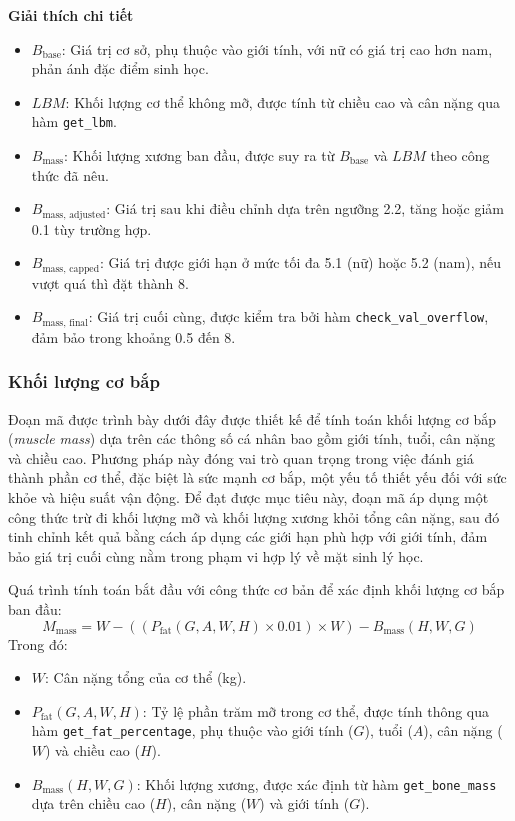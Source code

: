 \textbf{Giải thích chi tiết}
\begin{itemize}
    \item \( B_{\text{base}} \): Giá trị cơ sở, phụ thuộc vào giới tính, với nữ có giá trị cao hơn nam, phản ánh đặc điểm sinh học.
    \item \( LBM \): Khối lượng cơ thể không mỡ, được tính từ chiều cao và cân nặng qua hàm \texttt{get\_lbm}.
    \item \( B_{\text{mass}} \): Khối lượng xương ban đầu, được suy ra từ \( B_{\text{base}} \) và \( LBM \) theo công thức đã nêu.
    \item \( B_{\text{mass, adjusted}} \): Giá trị sau khi điều chỉnh dựa trên ngưỡng 2.2, tăng hoặc giảm 0.1 tùy trường hợp.
    \item \( B_{\text{mass, capped}} \): Giá trị được giới hạn ở mức tối đa 5.1 (nữ) hoặc 5.2 (nam), nếu vượt quá thì đặt thành 8.
    \item \( B_{\text{mass, final}} \): Giá trị cuối cùng, được kiểm tra bởi hàm \texttt{check\_val\_overflow}, đảm bảo trong khoảng 0.5 đến 8.
\end{itemize}

\subsubsection{Khối lượng cơ bắp}
Đoạn mã được trình bày dưới đây được thiết kế để tính toán khối lượng cơ bắp (\textit{muscle mass}) dựa trên các thông số cá nhân bao gồm giới tính, tuổi, cân nặng và chiều cao. Phương pháp này đóng vai trò quan trọng trong việc đánh giá thành phần cơ thể, đặc biệt là sức mạnh cơ bắp, một yếu tố thiết yếu đối với sức khỏe và hiệu suất vận động. Để đạt được mục tiêu này, đoạn mã áp dụng một công thức trừ đi khối lượng mỡ và khối lượng xương khỏi tổng cân nặng, sau đó tinh chỉnh kết quả bằng cách áp dụng các giới hạn phù hợp với giới tính, đảm bảo giá trị cuối cùng nằm trong phạm vi hợp lý về mặt sinh lý học.

Quá trình tính toán bắt đầu với công thức cơ bản để xác định khối lượng cơ bắp ban đầu:
\[
M_{\text{mass}} = W - \left(\left(P_{\text{fat}}(G, A, W, H) \times 0.01\right) \times W\right) - B_{\text{mass}}(H, W, G)
\]
Trong đó:
\begin{itemize}
    \item \( W \): Cân nặng tổng của cơ thể (kg).
    \item \( P_{\text{fat}}(G, A, W, H) \): Tỷ lệ phần trăm mỡ trong cơ thể, được tính thông qua hàm \texttt{get\_fat\_percentage}, phụ thuộc vào giới tính (\( G \)), tuổi (\( A \)), cân nặng (\( W \)) và chiều cao (\( H \)).
    \item \( B_{\text{mass}}(H, W, G) \): Khối lượng xương, được xác định từ hàm \texttt{get\_bone\_mass} dựa trên chiều cao (\( H \)), cân nặng (\( W \)) và giới tính (\( G \)).
\end{itemize}

